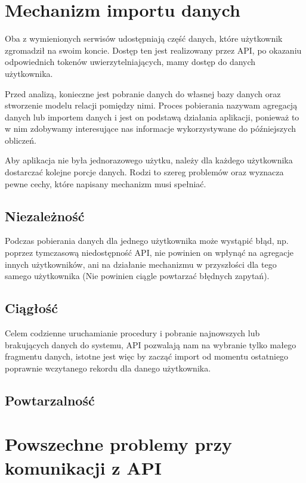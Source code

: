 \documentclass[brudnopis]{xmgr}
\begin{document}
    \section{Mechanizm importu danych}

        Oba z wymienionych serwisów udostępniają część danych, które użytkownik zgromadził na swoim koncie.
        Dostęp ten jest realizowany przez API, po okazaniu odpowiednich tokenów uwierzytelniających, mamy dostęp do danych użytkownika.

        Przed analizą, konieczne jest pobranie danych do własnej bazy danych oraz stworzenie modelu relacji pomiędzy nimi.
        Proces pobierania nazywam agregacją danych lub importem danych i jest on podstawą działania aplikacji,
        ponieważ to w nim zdobywamy interesujące nas informacje wykorzystywane do późniejszych obliczeń.

        Aby aplikacja nie była jednorazowego użytku, należy dla każdego użytkownika dostarczać kolejne porcje danych.
        Rodzi to szereg problemów oraz wyznacza pewne cechy, które napisany mechanizm musi spełniać.

        \subsection*{Niezależność}
        Podczas pobierania danych dla jednego użytkownika może wystąpić błąd, np. poprzez tymczasową niedostępność API,
        nie powinien on wpłynąć na agregacje innych użytkowników, ani na działanie mechanizmu w przyszłości dla tego samego użytkownika
        (Nie powinien ciągle powtarzać błędnych zapytań).

        \subsection*{Ciągłość}
        Celem codzienne uruchamianie procedury i pobranie najnowszych lub brakujących danych do systemu,
        API pozwalają nam na wybranie tylko małego fragmentu danych, istotne jest więc by zacząć import
        od momentu ostatniego poprawnie wczytanego rekordu dla danego użytkownika.

        \subsection*{Powtarzalność}

    \section{Powszechne problemy przy komunikacji z API}
\end{document}
